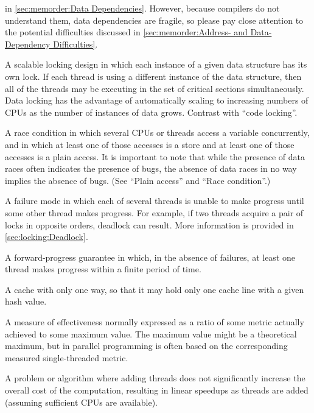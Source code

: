 \begin{description}
	in \cref{sec:memorder:Data Dependencies}.
	However, because compilers do not understand them, data
	dependencies are fragile, so please pay close attention to the
	potential difficulties discussed in
	\cref{sec:memorder:Address- and Data-Dependency Difficulties}.
\item[\IXGh{Data}{Locking}:]
	A scalable locking design in which each instance of a given
	data structure has its own lock.
	If each thread is using a different instance of the
	data structure, then all of the threads may be executing in
	the set of critical sections simultaneously.
	Data locking has the advantage of automatically scaling to
	increasing numbers of CPUs as the number of instances of
	data grows.
	Contrast with ``code locking''.
\item[\IXG{Data Race}:]
	A race condition in which several CPUs or threads access
	a variable concurrently, and in which at least one of those
	accesses is a store and at least one of those accesses
	is a plain access.
	It is important to note that while the presence of data races
	often indicates the presence of bugs, the absence of data races
	in no way implies the absence of bugs.
	(See ``Plain access'' and ``Race condition''.)
\item[\IXG{Deadlock}:]
	A failure mode in which each of several threads is unable to
	make progress until some other thread makes progress.
	For example, if two threads acquire a pair of locks in opposite
	orders, deadlock can result.
	More information is provided in
	\cref{sec:locking:Deadlock}.
\item[\IXG{Deadlock Free}:]
	A forward-progress guarantee in which, in the absence of
	failures, at least one thread makes progress within a finite
	period of time.
\item[\IXGh{Direct-Mapped}{Cache}:]
	A cache with only one way, so that it may hold only one cache
	line with a given hash value.
\item[\IXG{Efficiency}:]
	A measure of effectiveness normally expressed as a ratio
	of some metric actually achieved to some maximum value.
	The maximum value might be a theoretical maximum, but in
	parallel programming is often based on the corresponding
	measured single-threaded metric.
\item[\IXG{Embarrassingly Parallel}:]
	A problem or algorithm where adding threads does not significantly
	increase the overall cost of the computation, resulting in
	linear speedups as threads are added (assuming sufficient
	CPUs are available).
\item[\IXGalth{Energy Efficiency}{energy}{efficiency}:]

\end{description}
